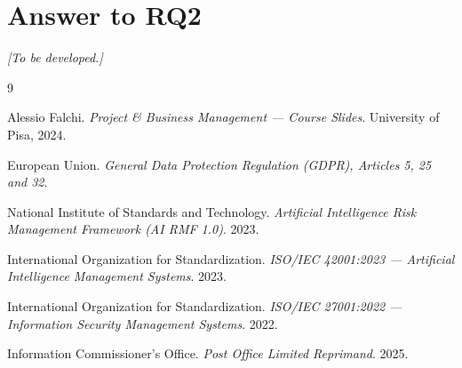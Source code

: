 \documentclass[12pt,a4paper]{article}
\begin{document}
\section{Answer to RQ2}
\label{sec:rq2_synthesis}
\textit{[To be developed.]}

\begin{thebibliography}{9}

Alessio Falchi.
\textit{Project \& Business Management --- Course Slides}.
University of Pisa, 2024.

European Union.
\textit{General Data Protection Regulation (GDPR), Articles 5, 25 and 32}.

National Institute of Standards and Technology.
\textit{Artificial Intelligence Risk Management Framework (AI RMF 1.0)}.
2023.

International Organization for Standardization.
\textit{ISO/IEC 42001:2023 --- Artificial Intelligence Management Systems}.
2023.

International Organization for Standardization.
\textit{ISO/IEC 27001:2022 --- Information Security Management Systems}.
2022.

Information Commissioner's Office.
\textit{Post Office Limited Reprimand}.
2025.

\end{thebibliography}
\end{document}
